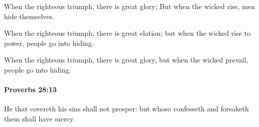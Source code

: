 			\begin{versebox}
					\item[BHS] 
					\item[ASV] When the righteous triumph, there is great glory; But when the wicked rise, men hide themselves.
					\item[NIV] When the righteous triumph, there is great elation; but when the wicked rise to power, people go into hiding.
					\item[NRSV] When the righteous triumph, there is great glory, but when the wicked prevail, people go into hiding.
			\end{versebox}

		\paragraph{Proverbs 28:13} %
			\label{PROVERBS-28-13}

			He that covereth his sins shall not prosper: but whoso confesseth and forsaketh them shall have mercy.

